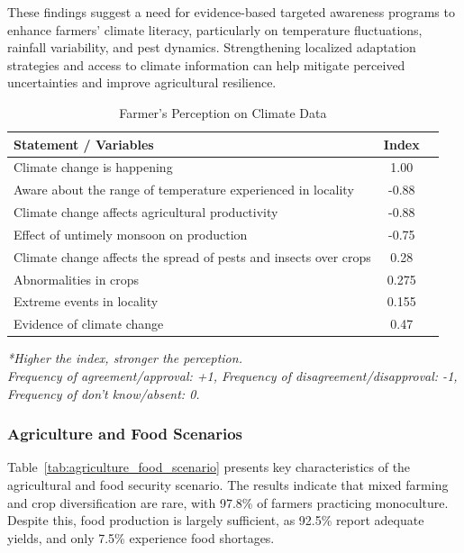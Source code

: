 These findings suggest a need for evidence-based targeted awareness programs to enhance farmers’ climate literacy, particularly on temperature fluctuations, rainfall variability, and pest dynamics. Strengthening localized adaptation strategies and access to climate information can help mitigate perceived uncertainties and improve agricultural resilience.


\begin{table}[htbp]
    \centering
    \caption{Farmer’s Perception on Climate Data}
    \label{tab:farmers_perception}
    \begin{tabular}{@{}lcc@{}}
        \toprule
        \textbf{Statement / Variables} & \textbf{Index} \\
        \midrule
        Climate change is happening & 1.00 \\
        Aware about the range of temperature experienced in locality & -0.88 \\
        Climate change affects agricultural productivity & -0.88 \\
        Effect of untimely monsoon on production & -0.75 \\
        Climate change affects the spread of pests and insects over crops & 0.28 \\
        Abnormalities in crops & 0.275 \\
        Extreme events in locality & 0.155 \\
        Evidence of climate change & 0.47 \\
        \bottomrule
    \end{tabular}
    \vspace{0.5cm}

    \textit{*Higher the index, stronger the perception.} \\
    \textit{Frequency of agreement/approval: +1, Frequency of disagreement/disapproval: -1, Frequency of don't know/absent: 0.}
\end{table}

\subsubsection{Agriculture and Food Scenarios}
Table~\ref{tab:agriculture_food_scenario} presents key characteristics of the agricultural and food security scenario. The results indicate that mixed farming and crop diversification are rare, with 97.8\% of farmers practicing monoculture. Despite this, food production is largely sufficient, as 92.5\% report adequate yields, and only 7.5\% experience food shortages.

